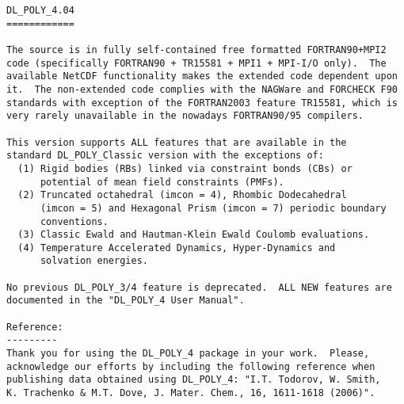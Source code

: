 \label{readme}
\begin{verbatim}
DL_POLY_4.04
============

The source is in fully self-contained free formatted FORTRAN90+MPI2
code (specifically FORTRAN90 + TR15581 + MPI1 + MPI-I/O only).  The
available NetCDF functionality makes the extended code dependent upon
it.  The non-extended code complies with the NAGWare and FORCHECK F90
standards with exception of the FORTRAN2003 feature TR15581, which is
very rarely unavailable in the nowadays FORTRAN90/95 compilers.

This version supports ALL features that are available in the
standard DL_POLY_Classic version with the exceptions of:
  (1) Rigid bodies (RBs) linked via constraint bonds (CBs) or
      potential of mean field constraints (PMFs).
  (2) Truncated octahedral (imcon = 4), Rhombic Dodecahedral
      (imcon = 5) and Hexagonal Prism (imcon = 7) periodic boundary
      conventions.
  (3) Classic Ewald and Hautman-Klein Ewald Coulomb evaluations.
  (4) Temperature Accelerated Dynamics, Hyper-Dynamics and
      solvation energies.

No previous DL_POLY_3/4 feature is deprecated.  ALL NEW features are
documented in the "DL_POLY_4 User Manual".

Reference:
---------
Thank you for using the DL_POLY_4 package in your work.  Please,
acknowledge our efforts by including the following reference when
publishing data obtained using DL_POLY_4: "I.T. Todorov, W. Smith,
K. Trachenko & M.T. Dove, J. Mater. Chem., 16, 1611-1618 (2006)".


\end{verbatim}
